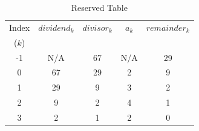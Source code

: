 \begin{table}
\caption{Reserved Table}
\label{tbl:siov0:01}
\begin{center}
\begin{tabular}{|c|c|c|c|c|}
\hline
\small{Index} & \small{$dividend_k$}  & \small{$divisor_k$} & \small{$a_k$}   & \small{$remainder_k$} \\
\small{($k$)} &                       &                     &                 &                       \\
\hline
\hline
\small{-1}    & \small{N/A}           & \small{67}          & \small{N/A}     & \small{29}            \\
\hline
\small{0}     & \small{67}            & \small{29}          & \small{2}       & \small{9}             \\
\hline
\small{1}     & \small{29}            & \small{9}           & \small{3}       & \small{2}             \\
\hline
\small{2}     & \small{9}             & \small{2}           & \small{4}       & \small{1}             \\
\hline
\small{3}     & \small{2}             & \small{1}           & \small{2}       & \small{0}             \\
\hline
\end{tabular}
\end{center}
\end{table}

